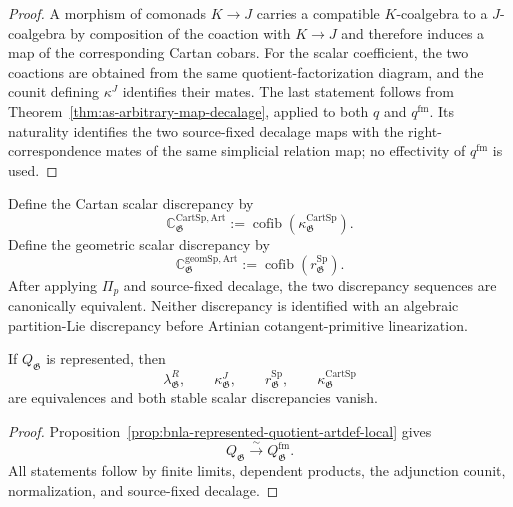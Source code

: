 \begin{proof}
A morphism of comonads $K\to J$ carries a compatible $K$-coalgebra to a
$J$-coalgebra by composition of the coaction with $K\to J$ and therefore
induces a map of the corresponding Cartan cobars.  For the scalar coefficient,
the two coactions are obtained from the same quotient-factorization diagram,
and the counit defining $\kappa^J$ identifies their mates.  The last statement follows from
Theorem~\ref{thm:as-arbitrary-map-decalage}, applied to both $q$ and
$q^{\mathrm{fm}}$.  Its naturality identifies the two source-fixed decalage
maps with the right-correspondence mates of the same simplicial relation
map; no effectivity of $q^{\mathrm{fm}}$ is used.
\end{proof}

\begin{definition}
\label{def:as-spencer-formalization-discrepancy}
Define the Cartan scalar discrepancy by
\[
\boxed{
    \mathbb C_{\mathfrak G}^{\mathrm{CartSp,Art}}
    :=
    \operatorname{cofib}
    \left(
        \kappa^{\mathrm{CartSp}}_{\mathfrak G}
    \right).
}
\]
Define the geometric scalar discrepancy by
\[
\boxed{
    \mathbb C_{\mathfrak G}^{\mathrm{geomSp,Art}}
    :=
    \operatorname{cofib}
    \left(
        r_{\mathfrak G}^{\mathrm{Sp}}
    \right).
}
\]
After applying $\Pi_p$ and source-fixed decalage, the two discrepancy
sequences are canonically equivalent.  Neither discrepancy is identified
with an algebraic partition-Lie discrepancy before Artinian cotangent-primitive
linearization.
\end{definition}

\begin{proposition}
\label{prop:as-raw-formalized-spencer-local}
If $Q_{\mathfrak G}$ is represented, then
\[
    \lambda^R_{\mathfrak G},
    \qquad
    \kappa^J_{\mathfrak G},
    \qquad
    r_{\mathfrak G}^{\mathrm{Sp}},
    \qquad
    \kappa^{\mathrm{CartSp}}_{\mathfrak G}
\]
are equivalences and both stable scalar discrepancies vanish.
\end{proposition}

\begin{proof}
Proposition~\ref{prop:bnla-represented-quotient-artdef-local} gives
\[
    Q_{\mathfrak G}
    \xrightarrow{\sim}
    Q_{\mathfrak G}^{\mathrm{fm}}.
\]
All statements follow by finite limits, dependent products, the adjunction
counit, normalization, and source-fixed decalage.
\end{proof}

